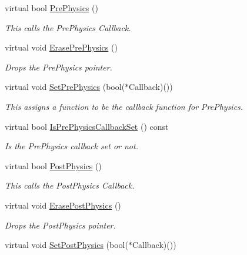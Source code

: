 \begin{DoxyCompactItemize}
virtual bool \hyperlink{classphys_1_1CallBackManager_a65867cc4855f0f8cd84a2b4a8bbf0fd6}{PrePhysics} ()
\begin{DoxyCompactList}\small\item\em This calls the PrePhysics Callback. \item\end{DoxyCompactList}\item 
virtual void \hyperlink{classphys_1_1CallBackManager_afaeba4d6ae245d1560b76799417cce40}{ErasePrePhysics} ()
\begin{DoxyCompactList}\small\item\em Drops the PrePhysics pointer. \item\end{DoxyCompactList}\item 
virtual void \hyperlink{classphys_1_1CallBackManager_a3f06ccacd416b3109f20c30cd30f9efe}{SetPrePhysics} (bool($\ast$Callback)())
\begin{DoxyCompactList}\small\item\em This assigns a function to be the callback function for PrePhysics. \item\end{DoxyCompactList}\item 
virtual bool \hyperlink{classphys_1_1CallBackManager_a8684425c42a4416a204852ce6a246dc6}{IsPrePhysicsCallbackSet} () const 
\begin{DoxyCompactList}\small\item\em Is the PrePhysics callback set or not. \item\end{DoxyCompactList}\item 
virtual bool \hyperlink{classphys_1_1CallBackManager_a06bf0e8787f21caf31bf428727155084}{PostPhysics} ()
\begin{DoxyCompactList}\small\item\em This calls the PostPhysics Callback. \item\end{DoxyCompactList}\item 
virtual void \hyperlink{classphys_1_1CallBackManager_a2d03573a93606e9d3fcd7adad5c8c397}{ErasePostPhysics} ()
\begin{DoxyCompactList}\small\item\em Drops the PostPhysics pointer. \item\end{DoxyCompactList}\item 
virtual void \hyperlink{classphys_1_1CallBackManager_a17687cd04807dfc80a25847be830c2f2}{SetPostPhysics} (bool($\ast$Callback)())

\end{DoxyCompactItemize}
